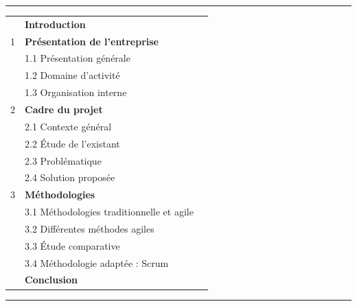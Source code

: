 \documentclass[12pt,a4paper]{report}
\newcommand{\ChapterTOC}[1]{%
\noindent{\large\bfseries Sommaire}\vspace{0.15cm}\par\noindent\rule{\textwidth}{0.55pt}\vspace{0.25cm}%
{\small\renewcommand{\arraystretch}{1.18}#1}\vspace{0.25cm}\par\noindent\rule{\textwidth}{0.55pt}}
\begin{document}
\ChapterTOC{%
\begin{tabular}{@{}p{}p{0.78\textwidth}r@{}}
& \textbf{Introduction}\dotfill & \textbf{\pageref{sec:ch1-intro}} \\
1 & \textbf{Présentation de l'entreprise}\dotfill & \textbf{\pageref{sec:ch1-entreprise}} \\
& \hspace{0.45cm}1.1 \quad Présentation générale\dotfill & \pageref{sec:ch1-presentation} \\
& \hspace{0.45cm}1.2 \quad Domaine d'activité\dotfill & \pageref{sec:ch1-domaine} \\
& \hspace{0.45cm}1.3 \quad Organisation interne\dotfill & \pageref{sec:ch1-org} \\
2 & \textbf{Cadre du projet}\dotfill & \textbf{\pageref{sec:ch1-cadre}} \\
& \hspace{0.45cm}2.1 \quad Contexte général\dotfill & \pageref{sec:ch1-contexte} \\
& \hspace{0.45cm}2.2 \quad Étude de l'existant\dotfill & \pageref{sec:ch1-existant} \\
& \hspace{0.45cm}2.3 \quad Problématique\dotfill & \pageref{sec:ch1-problematique} \\
& \hspace{0.45cm}2.4 \quad Solution proposée\dotfill & \pageref{sec:ch1-solution} \\
3 & \textbf{Méthodologies}\dotfill & \textbf{\pageref{sec:ch1-methodo}} \\
& \hspace{0.45cm}3.1 \quad Méthodologies traditionnelle et agile\dotfill & \pageref{sec:ch1-trad-agile} \\
& \hspace{0.45cm}3.2 \quad Différentes méthodes agiles\dotfill & \pageref{sec:ch1-agiles} \\
& \hspace{0.45cm}3.3 \quad Étude comparative\dotfill & \pageref{sec:ch1-comparatif} \\
& \hspace{0.45cm}3.4 \quad Méthodologie adaptée : Scrum\dotfill & \pageref{sec:ch1-scrum} \\
& \textbf{Conclusion}\dotfill & \textbf{\pageref{sec:ch1-conclusion}} \\
\end{tabular}}
\end{document}

